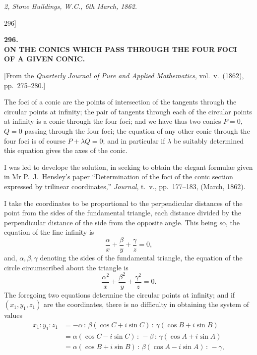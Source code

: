 \documentclass[11pt]{article}
\begin{document}
\medskip
\noindent\emph{2, Stone Buildings, W.C., 6th March, 1862.}

\vfill
\begin{flushright}\small 296]\end{flushright}

\newpage
\begin{center}
\textbf{\large 296.}\\[1ex]
\textbf{ON THE CONICS WHICH PASS THROUGH THE FOUR FOCI\\ OF A GIVEN CONIC.}
\end{center}

\begin{center}\small
[From the \emph{Quarterly Journal of Pure and Applied Mathematics}, vol.\ v.\ (1862), pp.\ 275--280.]
\end{center}

\medskip

The foci of a conic are the points of intersection of the tangents through the circular points at infinity; the pair of tangents through each of the circular points at infinity is a conic through the four foci; and we have thus two conics $P=0$, $Q=0$ passing through the four foci; the equation of any other conic through the four foci is of course $P+\lambda Q=0$; and in particular if $\lambda$ be suitably determined this equation gives the axes of the conic.

I was led to develope the solution, in seeking to obtain the elegant formulae given in Mr P.\ J.\ Hensley's paper ``Determination of the foci of the conic section expressed by trilinear coordinates,'' \emph{Journal}, t.\ v., pp.\ 177--183, (March, 1862).

I take the coordinates to be proportional to the perpendicular distances of the point from the sides of the fundamental triangle, each distance divided by the perpendicular distance of the side from the opposite angle. This being so, the equation of the line infinity is
\[ \frac{\alpha}{x}+\frac{\beta}{y}+\frac{\gamma}{z}=0, \]
and, $\alpha,\beta,\gamma$ denoting the sides of the fundamental triangle, the equation of the circle circumscribed about the triangle is
\[ \frac{\alpha^{2}}{x}+\frac{\beta^{2}}{y}+\frac{\gamma^{2}}{z}=0. \]
The foregoing two equations determine the circular points at infinity; and if $(x_{1},y_{1},z_{1})$ are the coordinates, there is no difficulty in obtaining the system of values
\[
\begin{aligned}
x_{1} : y_{1} : z_{1} &= -\alpha \,:\, \beta(\cos C + i\sin C) \,:\, \gamma(\cos B + i\sin B)\\
&= \alpha(\cos C - i\sin C) \,:\, -\beta \,:\, \gamma(\cos A + i\sin A)\\
&= \alpha(\cos B + i\sin B) \,:\, \beta(\cos A - i\sin A) \,:\, -\gamma,
\end{aligned}
\]
\end{document}

